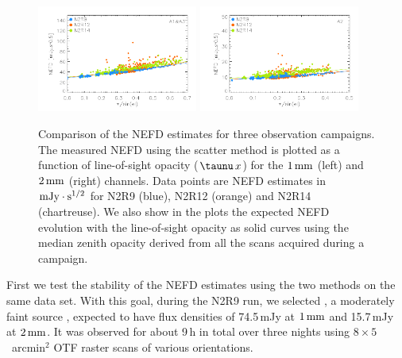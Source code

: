 \begin{figure}[!thbp]
\begin{center}
\includegraphics[clip=true,width=0.47\textwidth]{Figures/plot_nefd_vs_obstau_corrected_skydip_vfinal_1mm.pdf}
\includegraphics[clip=true,width=0.47\textwidth]{Figures/plot_nefd_vs_obstau_corrected_skydip_vfinal_a2.pdf}
\caption{Comparison of the NEFD estimates for three observation
  campaigns. The measured NEFD using the scatter method is plotted as a function of
  line-of-sight opacity ($\taunu\,x$) for the $1\,\rm{mm}$ (left) and $2\,\rm{mm}$ (right)
  channels. Data points are NEFD estimates in $\rm{mJy}\cdot s^{1/2}$ for N2R9 (blue), N2R12 (orange)
  and N2R14 (chartreuse). We also show in the plots the expected NEFD evolution
  with the line-of-sight opacity as solid curves using the median
  zenith opacity derived from all the scans acquired during a campaign.}
\label{fig:nefdvsbackground_below_1Jy}
\end{center}
\end{figure}

First we test the stability of the NEFD estimates using the two methods on the
same data set. With this goal, during the N2R9 run, we selected \hls, a
moderately faint source \citep{2012A&A...538L...4C}, expected to have
flux densities of 74.5\,mJy at $1\,\rm{mm}$
and 15.7\,mJy at $2\, \rm{mm}$. %
It was observed for about 9\,h in total over three nights using
$8 \times 5$~arcmin$^2$ OTF raster scans of various orientations.\\


